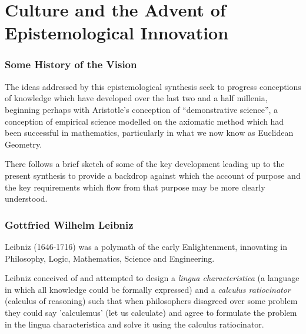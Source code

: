 \documentclass[10pt,titlepage]{book}
\begin{document}
\chapter{Culture and the Advent of Epistemological Innovation}

\subsection{Some History of the Vision}

The ideas addressed by this epistemological synthesis seek to progress conceptions of knowledge which have developed over the last two and a half millenia, beginning perhaps with Aristotle's conception of ``demonstrative science'', a conception of empirical science modelled on the axiomatic method which had been successful in mathematics, particularly in what we now know as Euclidean Geometry.

There follows a brief sketch of some of the key development leading up to the present synthesis to provide a backdrop against which the account of purpose and the key requirements which flow from that purpose may be more clearly understood.

\subsection{Gottfried Wilhelm Leibniz}

Leibniz (1646-1716) was a polymath of the early Enlightenment, innovating in Philosophy, Logic, Mathematics, Science and Engineering. 

Leibniz conceived of and attempted to design a \emph{lingua characteristica} (a language in which all knowledge could be formally expressed) and a \emph{calculus ratiocinator} (calculus of reasoning) such that when philosophers disagreed over some problem they could say 'calculemus' (let us calculate) and agree to formulate the problem in the lingua characteristica and solve it using the calculus ratiocinator.
\end{document}
